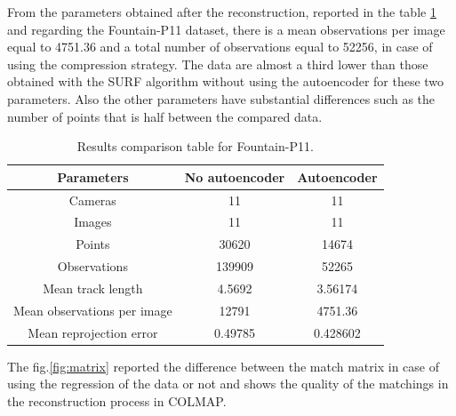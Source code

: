 From the parameters obtained after the reconstruction, reported in the table \ref{table:result} and regarding the Fountain-P11 dataset, there is a mean observations per image equal to 4751.36 and a total number of observations equal to 52256, in case of using the compression strategy. The data are almost a third lower than those obtained with the SURF algorithm without using the autoencoder for these two parameters. Also the other parameters have substantial differences such as the number of points that is half between the compared data.

\begin{table}[h!]
\centering
\begin{tabular}{ |c|c|c| } 
\hline
\textbf{Parameters} & \textbf{No autoencoder} & \textbf{Autoencoder} \\ [0.5ex]
\hline
 Cameras & 11 & 11 \\ [0.5ex]
 Images & 11 & 11 \\ [0.5ex]
 Points & 30620 & 14674 \\ [0.5ex]
 Observations & 139909 & 52265 \\ [0.5ex]
 Mean track length & 4.5692 & 3.56174 \\ [0.5ex]
 Mean observations per image & 12791 & 4751.36 \\ [0.5ex]
 Mean reprojection error & 0.49785 & 0.428602 \\ [0.5ex]
 \hline
\end{tabular}
 \caption{Results comparison table for Fountain-P11.}
 \label{table:result}
\end{table}

The fig.\ref{fig:matrix} reported the difference between the match matrix in case of using the regression of the data or not and shows the quality of the matchings in the reconstruction process in COLMAP.

